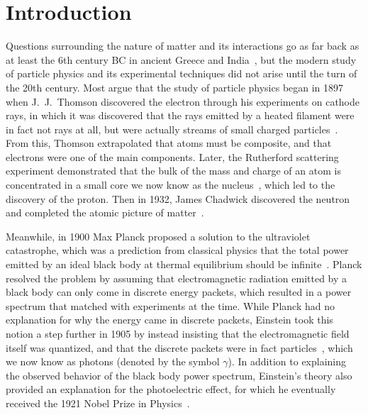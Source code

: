 
\chapter{Introduction}
\label{chap:intro}

Questions surrounding the nature of matter and its interactions go as far back as at least the 6th century BC in ancient Greece and India~\cite{PhysNuclphys196p}, but the modern study of particle physics and its experimental techniques did not arise until the turn of the 20th century.
Most argue that the study of particle physics began in 1897 when J.\ J.\ Thomson discovered the electron through his experiments on cathode rays, in which it was discovered that the rays emitted by a heated filament were in fact not rays at all, but were actually streams of small charged particles~\cite{GriffithsParticle}.
From this, Thomson extrapolated that atoms must be composite, and that electrons were one of the main components.
Later, the Rutherford scattering experiment demonstrated that the bulk of the mass and charge of an atom is concentrated in a small core we now know as the nucleus~\cite{BargerCollider}, which led to the discovery of the proton.
Then in 1932, James Chadwick discovered the neutron and completed the atomic picture of matter~\cite{weinberg2003discovery}.

Meanwhile, in 1900 Max Planck proposed a solution to the ultraviolet catastrophe, which was a prediction from classical physics that the total power emitted by an ideal black body at thermal equilibrium should be infinite~\cite{schroeder2013introduction}.
Planck resolved the problem by assuming that electromagnetic radiation emitted by a black body can only come in discrete energy packets, which resulted in a power spectrum that matched with experiments at the time.
While Planck had no explanation for why the energy came in discrete packets, Einstein took this notion a step further in 1905 by instead insisting that the electromagnetic field itself was quantized, and that the discrete packets were in fact particles~\cite{doi:10.1002/andp.19053220607}, which we now know as photons (denoted by the symbol $\gamma$).
In addition to explaining the observed behavior of the black body power spectrum, Einstein's theory also provided an explanation for the photoelectric effect, for which he eventually received the 1921 Nobel Prize in Physics~\cite{NobelPrize:1921-Physics}.

